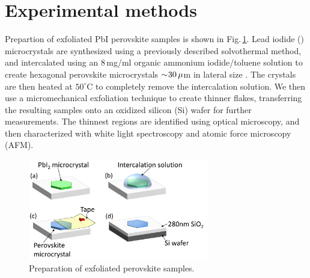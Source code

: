 \section{Experimental methods}
Prepartion of exfoliated PbI perovskite samples is shown in Fig.\,\ref{5Fig1}. Lead iodide () microcrystals are synthesized using a previously described solvothermal method, and intercalated using an 8\,mg/ml organic ammonium iodide/toluene solution to create hexagonal perovskite microcrystals $\sim\negmedspace30\,\mu$m in lateral size \cite{Saikumar2012}. The crystals are then heated at $50^{\circ}$C to completely remove the intercalation solution. We then use a micromechanical exfoliation technique to create thinner flakes, transferring the resulting samples onto an oxidized silicon (Si) wafer for further measurements. The thinnest regions are identified using optical microscopy, and then characterized with white light spectroscopy and atomic force microscopy (AFM).
\begin{figure}[h!] 
\centering    
\includegraphics[width=0.7\textwidth]{Fig1}
\caption{Preparation of exfoliated perovskite samples.}
\label{5Fig1}
\end{figure}

